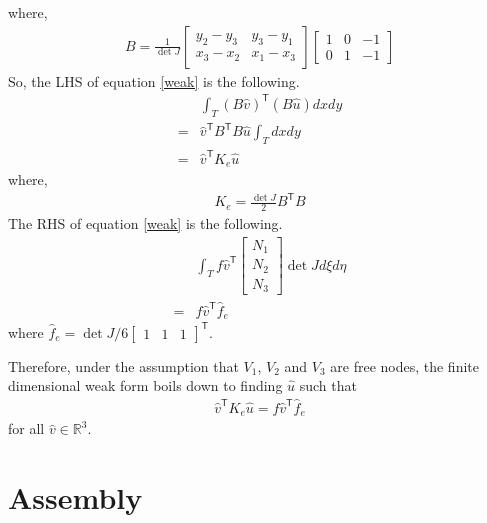 \documentclass{article}
\begin{document}
where,
\begin{align*}
	B = \frac{1}{\det J} 
	\begin{bmatrix} y_2 - y_3 & y_3 - y_1 \\ x_3 - x_2 & x_1 - x_3 \end{bmatrix}
	\begin{bmatrix} 1 & 0 & -1 \\ 0 & 1 & -1 \end{bmatrix}
\end{align*}
So, the LHS of equation \ref{weak} is the following.
\begin{align*}
	& \int_T (B\hat{v})^{\mathsf{T}} (B\hat{u}) dxdy \\
	=& \hat{v}^{\mathsf{T}} B^{\mathsf{T}}B \hat{u} \int_T dxdy \\
	=& \hat{v}^{\mathsf{T}} K_e \hat{u}
\end{align*}
where,
\begin{align*}
	K_e = \frac{\det J}{2} B^{\mathsf{T}}B
\end{align*}
The RHS of equation \ref{weak} is the following.
\begin{align*}
	& \int_T f \hat{v}^{\mathsf{T}} \begin{bmatrix} N_1 \\ N_2 \\ N_3 \end{bmatrix} \det J d\xi d\eta \\
		= & f \hat{v}^{\mathsf{T}} \hat{f}_e 
\end{align*}
where $ \hat{f}_e = \det J/6 \begin{bmatrix} 1 & 1 & 1 \end{bmatrix}^{\mathsf{T}}$.

Therefore, under the assumption that
$V_1$, $V_2$ and $V_3$ are free nodes,
the finite dimensional weak form boils down to
finding $\hat{u}$ such that
\begin{align}
	\hat{v}^{\mathsf{T}} K_e \hat{u} = f \hat{v}^{\mathsf{T}} \hat{f}_e
	\label{elem_weak_form}
\end{align}
for all $\hat{v} \in \mathbb{R}^3$.

\section{Assembly}
\end{document}

